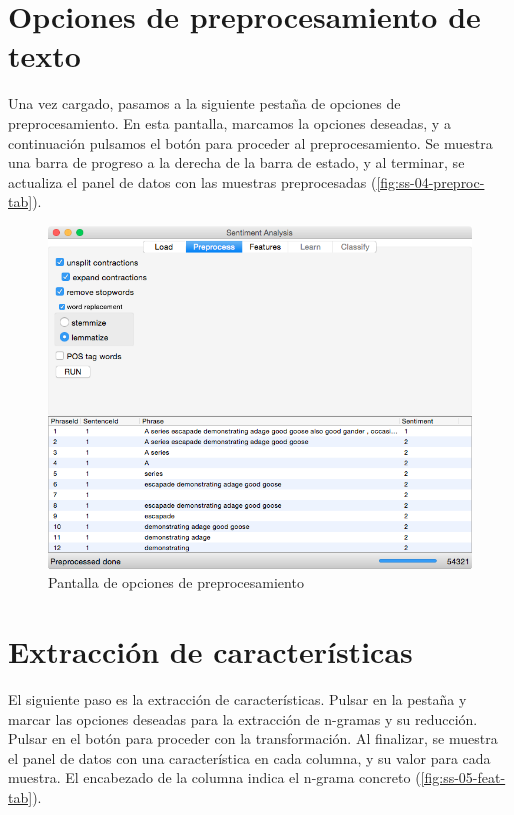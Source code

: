 \newpage
\section{Opciones de preprocesamiento de texto}
\label{sec:manual-preproc}

Una vez cargado, pasamos a la siguiente pestaña de opciones de preprocesamiento. En esta pantalla, marcamos la opciones deseadas, y a continuación pulsamos el botón  para proceder al preprocesamiento. Se muestra una barra de progreso a la derecha de la barra de estado, y al terminar, se actualiza el panel de datos con las muestras preprocesadas (\autoref{fig:ss-04-preproc-tab}).

\begin{figure}[H]
\centering
\includegraphics[width=12cm]{ss-04-preproc-tab}
\caption{Pantalla de opciones de preprocesamiento}
\label{fig:ss-04-preproc-tab}
\end{figure}

\newpage
\section{Extracción de características}
\label{sec:manual-features}

El siguiente paso es la extracción de características. Pulsar en la pestaña y marcar las opciones deseadas para la extracción de n-gramas y su reducción. Pulsar en el botón  para proceder con la transformación. Al finalizar, se muestra el panel de datos con una característica en cada columna, y su valor para cada muestra. El encabezado de la columna indica el n-grama concreto (\autoref{fig:ss-05-feat-tab}).

